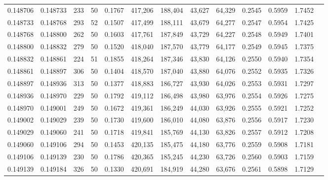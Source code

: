 \begin{tabular}{rrrrrrrrrrrrr}
0.148706 & 0.148733 &   233 &  50 &                                     0.1767 & 417,206 & 188,404 &  43,627 &  64,329 & 0.2545 & 0.5959 & 1.7452 \\
0.148733 & 0.148768 &   293 &  52 &                                     0.1507 & 417,499 & 188,111 &  43,679 &  64,277 & 0.2547 & 0.5954 & 1.7425 \\
0.148768 & 0.148800 &   262 &  50 &                                     0.1603 & 417,761 & 187,849 &  43,729 &  64,227 & 0.2548 & 0.5949 & 1.7401 \\
0.148800 & 0.148832 &   279 &  50 &                                     0.1520 & 418,040 & 187,570 &  43,779 &  64,177 & 0.2549 & 0.5945 & 1.7375 \\
0.148832 & 0.148861 &   224 &  51 &                                     0.1855 & 418,264 & 187,346 &  43,830 &  64,126 & 0.2550 & 0.5940 & 1.7354 \\
0.148861 & 0.148897 &   306 &  50 &                                     0.1404 & 418,570 & 187,040 &  43,880 &  64,076 & 0.2552 & 0.5935 & 1.7326 \\
0.148897 & 0.148936 &   313 &  50 &                                     0.1377 & 418,883 & 186,727 &  43,930 &  64,026 & 0.2553 & 0.5931 & 1.7297 \\
0.148936 & 0.148970 &   229 &  50 &                                     0.1792 & 419,112 & 186,498 &  43,980 &  63,976 & 0.2554 & 0.5926 & 1.7275 \\
0.148970 & 0.149001 &   249 &  50 &                                     0.1672 & 419,361 & 186,249 &  44,030 &  63,926 & 0.2555 & 0.5921 & 1.7252 \\
0.149002 & 0.149029 &   239 &  50 &                                     0.1730 & 419,600 & 186,010 &  44,080 &  63,876 & 0.2556 & 0.5917 & 1.7230 \\
0.149029 & 0.149060 &   241 &  50 &                                     0.1718 & 419,841 & 185,769 &  44,130 &  63,826 & 0.2557 & 0.5912 & 1.7208 \\
0.149060 & 0.149106 &   294 &  50 &                                     0.1453 & 420,135 & 185,475 &  44,180 &  63,776 & 0.2559 & 0.5908 & 1.7181 \\
0.149106 & 0.149139 &   230 &  50 &                                     0.1786 & 420,365 & 185,245 &  44,230 &  63,726 & 0.2560 & 0.5903 & 1.7159 \\
0.149139 & 0.149184 &   326 &  50 &                                     0.1330 & 420,691 & 184,919 &  44,280 &  63,676 & 0.2561 & 0.5898 & 1.7129 \\

\end{tabular}
